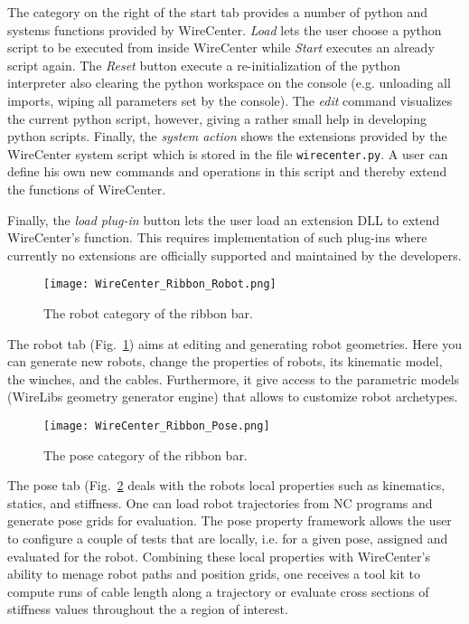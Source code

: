 \documentclass[11pt,a4paper,onepage,openany]{book}
\begin{document}
The category on the right of the start tab provides a number of python and systems
functions provided by WireCenter. \emph{Load} lets the user choose a python script
to be executed from inside WireCenter while \emph{Start} executes an already
 script again. The \emph{Reset} button execute a re-initialization of the python
 interpreter also clearing the python workspace on the console (e.g. unloading all
 imports, wiping all parameters set by the console). The \emph{edit} command
 visualizes the current python script, however, giving a rather small help in
 developing python scripts. Finally, the \emph{system action} shows the extensions
 provided by the WireCenter system script which is stored in the file
 \texttt{wirecenter.py}. A user can define his own new commands and operations in
 this script and thereby extend the functions of WireCenter.

Finally, the \emph{load plug-in} button lets the user load an extension DLL to
extend WireCenter's function. This requires implementation of such plug-ins where
currently no extensions are officially supported and maintained by the developers.

\begin{figure}[t]
  \centering
  \texttt{[image: WireCenter\_Ribbon\_Robot.png]}
  \caption{The robot category of the ribbon bar.}\label{fig:WireCenterRibbonRobot}
\end{figure}

The robot tab (Fig.~\ref{fig:WireCenterRibbonRobot}) aims at editing and generating robot geometries. Here you can generate new robots, change the properties of robots, its kinematic model, the winches, and the cables. Furthermore, it give access to the parametric models (WireLibs geometry generator engine) that allows to customize robot archetypes.

\begin{figure}[t]
  \centering
  \texttt{[image: WireCenter\_Ribbon\_Pose.png]}
  \caption{The pose category of the ribbon bar.}\label{fig:WireCenterRibbonPose}
\end{figure}

The pose tab (Fig.~\ref{fig:WireCenterRibbonPose} deals with the robots local properties such as kinematics, statics, and stiffness. One can load robot trajectories from NC programs and generate pose grids for evaluation. The pose property framework allows the user to configure a couple of tests that are locally, i.e. for a given pose, assigned and evaluated for the robot. Combining these local properties with WireCenter's ability to menage robot paths and position grids, one receives a tool kit to compute runs of cable length along a trajectory or evaluate cross sections of stiffness values throughout the a region of interest.
\end{document}
